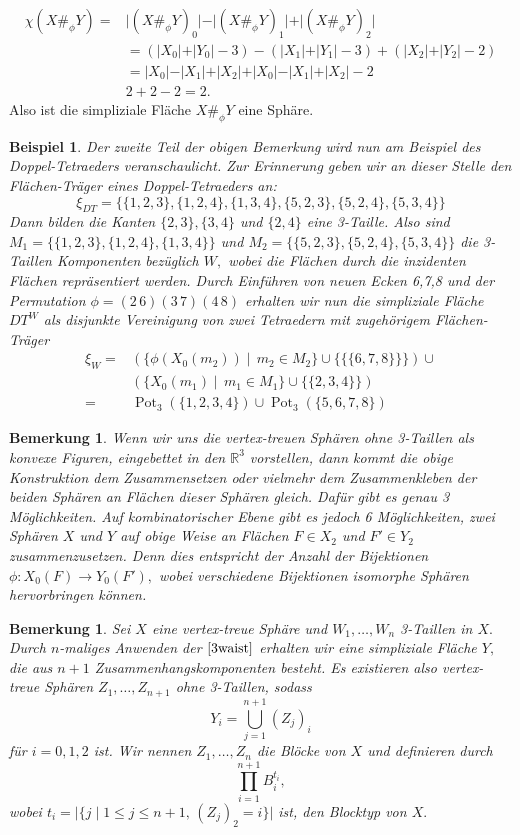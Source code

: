 \documentclass[12pt,titlepage,twoside,cleardoublepage]{article}
\theoremstyle{nummermitklammern}
\newtheorem{bsp}[temp]{Beispiel}
\newtheorem{bemerkung}[temp]{Bemerkung}
\newtheorem{bsp}[zahl]{Beispiel}
\newtheorem{bemerkung}[zahl]{Bemerkung}
\numberwithin{equation}{section}
\DeclareMathOperator{\Pot}{Pot}
\begin{document}
\begin{align*}
\chi(X\#_\phi Y)=&\vert(X\#_\phi Y)_0\vert -\vert (X\#_\phi Y)_1\vert +\vert (X\#_\phi Y)_2\vert\\
&=(\vert X_0\vert+\vert Y_0\vert-3)-(\vert X_1\vert+\vert Y_1\vert-3)+(\vert X_2\vert+\vert Y_2\vert-2)\\ 
&=\vert X_0\vert-\vert X_1\vert+\vert X_2\vert+\vert X_0\vert-\vert X_1\vert+\vert X_2\vert-2\\
&2+2-2=2.
\end{align*}
Also ist die simpliziale Fläche $X\#_\phi Y$ eine Sphäre. 
\begin{bsp}
Der zweite Teil der obigen Bemerkung wird nun am Beispiel des Doppel-Tetraeders veranschaulicht.
Zur Erinnerung geben wir an dieser Stelle den Flächen-Träger eines Doppel-Tetraeders an:
\[
\xi_{DT}=\{\{1,2,3\},\{1,2,4\},\{1,3,4\},\{5,2,3\},\{5,2,4\},\{5,3,4\}\}
\]
Dann bilden die Kanten $\{2,3\},\{3,4\}$ und $\{2,4\}$ eine 3-Taille. Also sind $M_1=\{\{1,2,3\},\{1,2,4\},\{1,3,4\}\}$ und $M_2=\{\{5,2,3\},\{5,2,4\},\{5,3,4\}\}$ die 3-Taillen Komponenten bezüglich $W,$ wobei die Flächen durch die inzidenten Flächen repräsentiert werden. Durch Einführen von neuen Ecken 6,7,8 und der Permutation $\phi=(2\, 6)(3\, 7)(4\,8)$ erhalten wir nun die simpliziale Fläche $DT^W$ als disjunkte Vereinigung von zwei Tetraedern mit zugehörigem Flächen-Träger
\begin{align*}
\xi_W=&(\{\phi(X_0(m_2))\mid \, m_2\in M_2\}\cup \{\{\{6,7,8\}\}\}) \cup \\
&(\{X_0(m_1)\mid \, m_1\in M_1\}\cup \{\{2,3,4\}\})\\
=&\Pot_3(\{1,2,3,4\})\cup \Pot_3(\{5,6,7,8\})
\end{align*}
\end{bsp}
\begin{bemerkung}
Wenn wir uns die vertex-treuen Sphären ohne 3-Taillen als konvexe Figuren, eingebettet in den $\mathbb{R}^3$ vorstellen, dann kommt die obige Konstruktion dem Zusammensetzen oder vielmehr dem Zusammenkleben der beiden Sphären an Flächen dieser Sphären gleich. Dafür gibt es genau 3 Möglichkeiten. Auf kombinatorischer Ebene gibt es jedoch 6 Möglichkeiten, zwei Sphären $X$ und $Y$ auf obige Weise an 
Flächen $F\in X_2$ und $F'\in Y_2$ zusammenzusetzen. Denn dies entspricht der Anzahl der Bijektionen $\phi:X_0(F)\to Y_0(F'),$ wobei verschiedene Bijektionen isomorphe Sphären hervorbringen können.
\end{bemerkung}
\begin{bemerkung}
Sei $X$ eine vertex-treue Sphäre und $W_1,\ldots,W_n$ 3-Taillen in $X.$ Durch  $n$-maliges Anwenden der $\Cref{3waist}$ erhalten wir eine simpliziale Fläche $Y,$ die aus $n+1$ Zusammenhangskomponenten besteht. Es existieren also vertex-treue Sphären $Z_1,\ldots,Z_{n+1}$ ohne 3-Taillen, sodass
\[
Y_i=\bigcup_{j=1}^{n+1}(Z_j)_i 
\]
für $i=0,1,2$ ist. Wir nennen $Z_1,\ldots,Z_n$ die \emph{Blöcke} von $X$ und definieren durch 
\[
\prod_{i=1}^{n+1} B_i^{t_i},
\]
wobei $t_i=\vert\{j \mid 1\leq j\leq n+1,\,(Z_j)_2=i\}\vert$ ist, den \emph{Blocktyp} von $X.$
\end{bemerkung}
\end{document}
